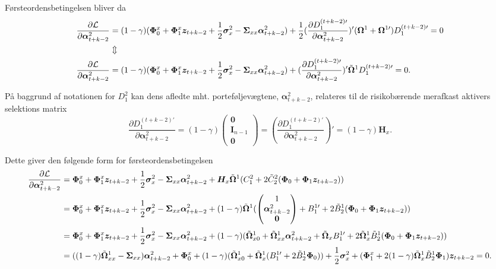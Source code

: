 \documentclass[
  a4paper,
  oneside]{memoir}
\begin{document}
Førsteordensbetingelsen bliver da
\begin{align*}
\frac{\partial \mathcal{L}}{\partial\bm{\alpha}_{t+k-2}^2 }&=(1-\gamma) (\bm{\Phi}_0^x+\bm{\Phi}_1^x\bm{z}_{t+k-2} + \frac{1}{2} \bm{\sigma}_x^2 -\bm{\Sigma}_{xx}\bm{\alpha}_{t+k-2}^2 ) + \frac{1}{2} (\frac{\partial D_1^{(t+k-2)\prime}}{\partial \bm{\alpha}_{t+k-2}^2})' (\bm{\Omega}^1+\bm{\Omega}^{1\prime}) D_1^{(t+k-2)\prime} = 0\\
&\Updownarrow\\
\frac{\partial \mathcal{L}}{\partial\bm{\alpha}_{t+k-2}^2 }&=(1-\gamma) (\bm{\Phi}_0^x+\bm{\Phi}_1^x\bm{z}_{t+k-2} + \frac{1}{2} \bm{\sigma}_x^2 -\bm{\Sigma}_{xx}\bm{\alpha}_{t+k-2}^2 ) + (\frac{\partial D_1^{(t+k-2)\prime}}{\partial \bm{\alpha}_{t+k-2}^2})' \Tilde{\bm{\Omega}}^1 D_1^{(t+k-2)\prime} = 0.
\end{align*}

På baggrund af notationen for \(D_1^2\) kan dens afledte mht. porteføljevægtene, \(\bm{\alpha}_{t+k-2}^2\), relateres til de risikobærende merafkast aktivers selektions matrix
\[\frac{\partial D_1^{(t+k-2)\prime}}{\partial \bm{\alpha}_{t+k-2}^2} = (1-\gamma) \begin{pmatrix} \bm{0} \\ \bm{I}_{n-1} \\ \bm{0}\end{pmatrix}=(\frac{\partial D_1^{(t+k-2)\prime}}{\partial \bm{\alpha}_{t+k-2}^2})' = (1-\gamma)\bm{H}_x.\]

Dette giver den følgende form for førsteordensbetingelsen
\begin{align*}
\frac{\partial \mathcal{L}}{\partial\bm{\alpha}_{t+k-2}^2 }&= \bm{\Phi}_0^x+\bm{\Phi}_1^x\bm{z}_{t+k-2}+\frac{1}{2} \bm{\sigma}_x^2 -\bm{\Sigma}_{xx}\bm{\alpha}_{t+k-2}^2 +\bm{H}_x\Tilde{\bm{\Omega}}^{1}(C_1^2+ 2\Tilde{C}_2^2 (\bm{\Phi}_0+\bm{\Phi}_1\bm{z}_{t+k-2}))\\
&=\bm{\Phi}_0^x+\bm{\Phi}_1^x\bm{z}_{t+k-2}+\frac{1}{2} \bm{\sigma}_x^2 -\bm{\Sigma}_{xx}\bm{\alpha}_{t+k-2}^2 + (1-\gamma)\Tilde{\bm{\Omega}}^{1} (\begin{pmatrix} 1\\ \bm{\alpha}_{t+k-2}^2 \\ \bm{0} \end{pmatrix} + B_1^{1\prime} + 2\Tilde{B}_2^1 (\bm{\Phi}_0+\bm{\Phi}_1\bm{z}_{t+k-2}))\\
&=\bm{\Phi}_0^x+\bm{\Phi}_1^x\bm{z}_{t+k-2}+\frac{1}{2} \bm{\sigma}_x^2 -\bm{\Sigma}_{xx}\bm{\alpha}_{t+k-2}^2 + (1-\gamma)(\Tilde{\bm{\Omega}}_{x0}^{1} + \Tilde{\bm{\Omega}}_{xx}^{1} \bm{\alpha}_{t+k-2}^2 + \Tilde{\bm{\Omega}}_{x} B_1^{1\prime}+ 2\Tilde{\bm{\Omega}}_{x}^1 \Tilde{B}_2^1 (\bm{\Phi}_0+\bm{\Phi}_1\bm{z}_{t+k-2}))\\
&=((1-\gamma)\Tilde{\bm{\Omega}}_{xx}^{1} - \bm{\Sigma}_{xx} )  \bm{\alpha}_{t+k-2}^2 + \bm{\Phi}_0^x + (1-\gamma)(\Tilde{\bm{\Omega}}_{x0}^{1} + \Tilde{\bm{\Omega}}_{x}^{1}(B_1^{1\prime} + 2\Tilde{B}_2^{1}\bm{\Phi}_0))+ \frac{1}{2} \bm{\sigma}_x^2 + (\bm{\Phi}_1^x + 2(1-\gamma)\Tilde{\bm{\Omega}}_{x}^{1} \Tilde{B}_2^1\bm{\Phi}_1 )\bm{z}_{t+k-2}=0.
\end{align*}
\end{document}
